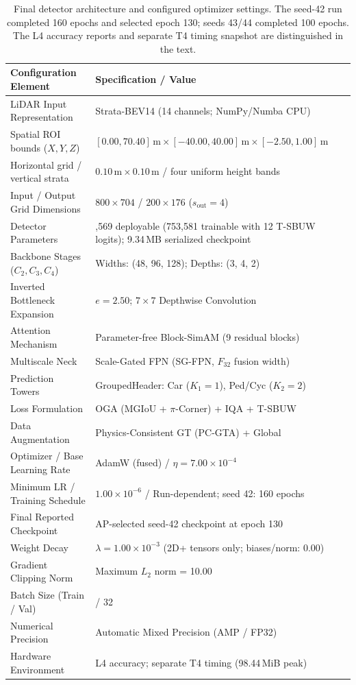 \begin{table}[t]
\centering\small
\caption{Final detector architecture and configured optimizer settings. The seed-42 run completed 160 epochs and selected epoch 130; seeds 43/44 completed 100 epochs. The L4 accuracy reports and separate T4 timing snapshot are distinguished in the text.}
\label{tab:setup}
\begin{tabular}{@{}>{\raggedright\arraybackslash}p{}>{\raggedright\arraybackslash}p{}@{}}
\toprule
\textbf{Configuration Element} & \textbf{Specification / Value} \\
\midrule
LiDAR Input Representation & Strata-BEV14 (14 channels; NumPy/Numba CPU) \\
Spatial ROI bounds ($X, Y, Z$) & $[0.00, 70.40]\,\text{m} \times [-40.00, 40.00]\,\text{m} \times [-2.50, 1.00]\,\text{m}$ \\
Horizontal grid / vertical strata & $0.10\,\text{m}\times0.10\,\text{m}$ / four uniform height bands \\
Input / Output Grid Dimensions & $800 \times 704$ / $200 \times 176$ ($s_{\mathrm{out}} = 4$) \\
Detector Parameters & 753,569 deployable (753,581 trainable with 12 T-SBUW logits); 9.34\,MB serialized checkpoint \\
Backbone Stages ($C_2, C_3, C_4$) & Widths: (48, 96, 128); Depths: (3, 4, 2) \\
Inverted Bottleneck Expansion & $e = 2.50$; $7 \times 7$ Depthwise Convolution \\
Attention Mechanism & Parameter-free Block-SimAM (9 residual blocks) \\
Multiscale Neck & Scale-Gated FPN (SG-FPN, $F_{32}$ fusion width) \\
Prediction Towers & GroupedHeader: Car ($K_1=1$), Ped/Cyc ($K_2=2$) \\
Loss Formulation & OGA (MGIoU + $\pi$-Corner) + IQA + T-SBUW \\
Data Augmentation & Physics-Consistent GT (PC-GTA) + Global \\
Optimizer / Base Learning Rate & AdamW (fused) / $\eta = 7.00 \times 10^{-4}$ \\
Minimum LR / Training Schedule & $1.00 \times 10^{-6}$ / Run-dependent; seed 42: 160 epochs \\
Final Reported Checkpoint & AP-selected seed-42 checkpoint at epoch 130 \\
Weight Decay & $\lambda = 1.00 \times 10^{-3}$ (2D+ tensors only; biases/norm: 0.00) \\
Gradient Clipping Norm & Maximum $L_2$ norm = 10.00 \\
Batch Size (Train / Val) & 16 / 32 \\
Numerical Precision & Automatic Mixed Precision (AMP / FP32) \\
Hardware Environment & L4 accuracy; separate T4 timing (98.44\,MiB peak) \\
\bottomrule
\end{tabular}
\end{table}
